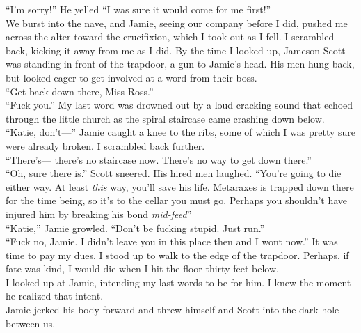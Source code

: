 \documentclass[a5paper]{scrartcl}
\begin{document}
\enquote{I'm sorry!} He yelled \enquote{I was sure it would come for me first!}\\


We burst into the nave, and Jamie, seeing our company before I did, pushed me across the alter toward the crucifixion, which I took out as I fell. I scrambled back, kicking it away from me as I did. By the time I looked up, Jameson Scott was standing in front of the trapdoor, a gun to Jamie's head. His men hung back, but looked eager to get involved at a word from their boss. \\


\enquote{Get back down there, Miss Ross.} \\


\enquote{Fuck you.} My last word was drowned out by a loud cracking sound that echoed  through the little church as the spiral staircase came crashing down below. \\


\enquote{Katie, don't---} Jamie caught a knee to the ribs, some of which I was pretty sure were already broken. I scrambled back further. \\


\enquote{There's--- there's no staircase now. There's no way to get down there.}\\


\enquote{Oh, sure there is.} Scott sneered. His hired men laughed. \enquote{You're going to die either way. At least \textit{this}
 way, you'll save his life. Metaraxes is trapped down there for the time being, so it's to the cellar you must go. Perhaps you shouldn't have injured him by breaking his bond \textit{mid-feed}}\\


\enquote{Katie,} Jamie growled. \enquote{Don't be fucking stupid. Just run.}\\


\enquote{Fuck no, Jamie. I didn't leave you in this place then and I wont now.} It was time to pay my dues. I stood up to walk to the edge of the trapdoor. Perhaps, if fate was kind, I would die when I hit the floor thirty feet below. \\


I looked up at Jamie, intending my last words to be for him. I knew the moment he realized that intent. \\


Jamie jerked his body forward and threw himself and Scott into the dark hole between us.\\
\end{document}
